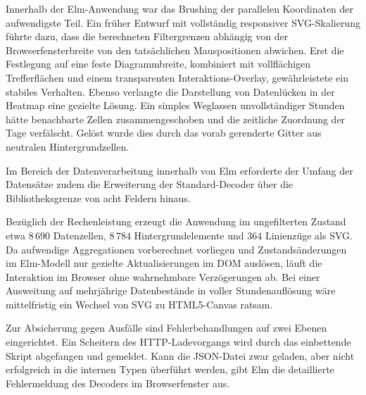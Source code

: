 Innerhalb der Elm-Anwendung war das Brushing der parallelen Koordinaten der aufwendigste Teil. Ein früher Entwurf mit vollständig responsiver SVG-Skalierung führte dazu, dass die berechneten Filtergrenzen abhängig von der Browserfensterbreite von den tatsächlichen Mauspositionen abwichen. Erst die Festlegung auf eine feste Diagrammbreite, kombiniert mit vollflächigen Trefferflächen und einem transparenten Interaktions-Overlay, gewährleistete ein stabiles Verhalten. Ebenso verlangte die Darstellung von Datenlücken in der Heatmap eine gezielte Lösung. Ein simples Weglassen unvollständiger Stunden hätte benachbarte Zellen zusammengeschoben und die zeitliche Zuordnung der Tage verfälscht. Gelöst wurde dies durch das vorab gerenderte Gitter aus neutralen Hintergrundzellen.

Im Bereich der Datenverarbeitung innerhalb von Elm erforderte der Umfang der Datensätze zudem die Erweiterung der Standard-Decoder über die Bibliotheksgrenze von acht Feldern hinaus.

Bezüglich der Rechenleistung erzeugt die Anwendung im ungefilterten Zustand etwa $8\,690$ Datenzellen, $8\,784$ Hintergrundelemente und $364$ Linienzüge als SVG. Da aufwendige Aggregationen vorberechnet vorliegen und Zustandsänderungen im Elm-Modell nur gezielte Aktualisierungen im DOM auslösen, läuft die Interaktion im Browser ohne wahrnehmbare Verzögerungen ab. Bei einer Ausweitung auf mehrjährige Datenbestände in voller Stundenauflösung wäre mittelfristig ein Wechsel von SVG zu HTML5-Canvas ratsam.

Zur Absicherung gegen Ausfälle sind Fehlerbehandlungen auf zwei Ebenen eingerichtet. Ein Scheitern des HTTP-Ladevorgangs wird durch das einbettende Skript abgefangen und gemeldet. Kann die JSON-Datei zwar geladen, aber nicht erfolgreich in die internen Typen überführt werden, gibt Elm die detaillierte Fehlermeldung des Decoders im Browserfenster aus.

